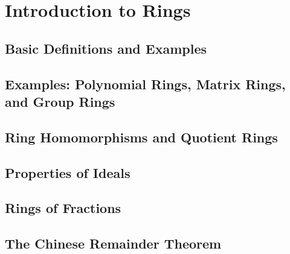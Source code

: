 \chapter{Introduction to Rings}

\section{Basic Definitions and Examples}

\section{Examples: Polynomial Rings, Matrix Rings, and Group Rings}

\section{Ring Homomorphisms and Quotient Rings}

\section{Properties of Ideals}

\section{Rings of Fractions}

\section{The Chinese Remainder Theorem}
